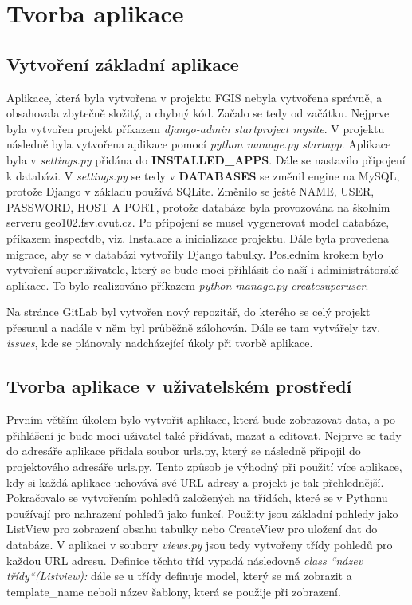 \chapter{Tvorba aplikace}
\label{4-tvorba-aplikace}

\section{Vytvoření základní aplikace}

Aplikace, která byla vytvořena v projektu FGIS nebyla vytvořena
správně, a obsahovala zbytečně složitý, a chybný kód. Začalo se tedy
od začátku. Nejprve byla vytvořen projekt příkazem \emph{django-admin
  startproject mysite}. V projektu následně byla vytvořena aplikace
pomocí \emph{python manage.py startapp}. Aplikace byla v
\emph{settings.py} přidána do \textbf{INSTALLED\_APPS}. Dále se
nastavilo připojení k databázi. V \emph{settings.py} se tedy v
\textbf{DATABASES} se změnil engine na MySQL, protože Django v základu
používá SQLite. Změnilo se ještě NAME, USER, PASSWORD, HOST A PORT,
protože databáze byla provozována na školním serveru
geo102.fsv.cvut.cz. Po připojení se musel vygenerovat model databáze,
příkazem inspectdb, viz. Instalace a inicializace projektu. Dále byla
provedena migrace, aby se v databázi vytvořily Django
tabulky. Posledním krokem bylo vytvoření superuživatele, který se bude
moci přihlásit do naší i administrátorské aplikace. To bylo
realizováno příkazem \emph{python manage.py createsuperuser}.

Na stránce GitLab byl vytvořen nový repozitář, do kterého se celý
projekt přesunul a nadále v něm byl průběžně zálohován. Dále se tam
vytvářely tzv. \emph{issues}, kde se plánovaly nadcházející úkoly při
tvorbě aplikace.

\section{Tvorba aplikace v uživatelském prostředí}

Prvním větším úkolem bylo vytvořit aplikace, která bude zobrazovat
data, a po přihlášení je bude moci uživatel také přidávat, mazat a
editovat. Nejprve se tady do adresáře aplikace přidala soubor urls.py,
který se následně připojil do projektového adresáře urls.py. Tento
způsob je výhodný při použití více aplikace, kdy si každá aplikace
uchovává své URL adresy a projekt je tak přehlednější. Pokračovalo se
vytvořením pohledů založených na třídách, které se v Pythonu používají
pro nahrazení pohledů jako funkcí. Použity jsou základní pohledy jako
ListView pro zobrazení obsahu tabulky nebo CreateView pro uložení dat
do databáze. V aplikaci v soubory \emph{views.py} jsou tedy vytvořeny
třídy pohledů pro každou URL adresu. Definice těchto tříd vypadá
následovně \emph{class “název třídy“(Listview):} dále se u třídy
definuje model, který se má zobrazit a template\_name neboli název
šablony, která se použije při zobrazení.

